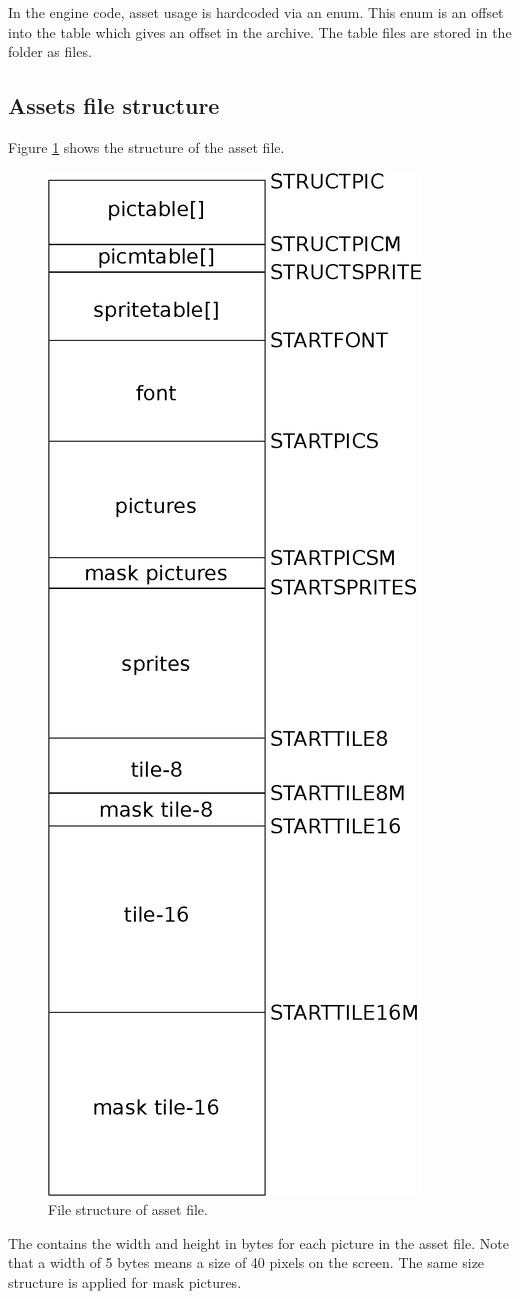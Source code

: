 \documentclass[book.tex]{subfiles}
\begin{document}
 In the engine code, asset usage is hardcoded via an enum. This enum is an offset into the  table which gives an offset in the  archive. The  table files are stored in the  folder as  files.\\

\subsection{Assets file structure}
Figure \ref{fig:asset-file} shows the structure of the  asset file.
\begin{figure}[H]
\centering
 \includegraphics[width=.5\textwidth]{imgs/drawings/graphic_assets.eps}
 \caption{File structure of  asset file.}
 \label{fig:asset-file}
\end{figure}

The  contains the width and height in bytes for each picture in the asset file. Note that a width of 5 bytes means a size of 40 pixels on the screen. The same size structure is applied for mask pictures.\\
\end{document}
